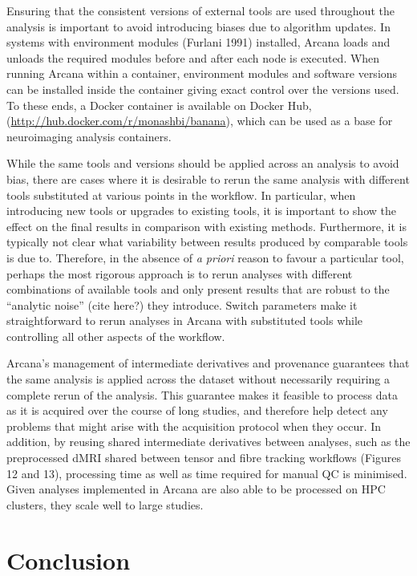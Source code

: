 Ensuring that the consistent versions of external tools are used
throughout the analysis is important to avoid introducing biases due to
algorithm updates. In systems with environment modules (Furlani 1991)
installed, Arcana loads and unloads the required modules before and
after each node is executed. When running Arcana within a container,
environment modules and software versions can be installed inside the
container giving exact control over the versions used. To these ends, a
Docker container is available on Docker Hub,
(\href{http://hub.docker.com/r/monashbi/banana}{{http://hub.docker.com/r/monashbi/banana}}),
which can be used as a base for neuroimaging analysis containers.

While the same tools and versions should be applied across an analysis
to avoid bias, there are cases where it is desirable to rerun the same
analysis with different tools substituted at various points in the
workflow. In particular, when introducing new tools or upgrades to
existing tools, it is important to show the effect on the final results
in comparison with existing methods. Furthermore, it is typically not
clear what variability between results produced by comparable tools is
due to. Therefore, in the absence of \emph{a priori} reason to favour a
particular tool, perhaps the most rigorous approach is to rerun analyses
with different combinations of available tools and only present results
that are robust to the ``analytic noise'' (cite here?) they introduce.
Switch parameters make it straightforward to rerun analyses in Arcana
with substituted tools while controlling all other aspects of the
workflow.

Arcana's management of intermediate derivatives and provenance
guarantees that the same analysis is applied across the dataset without
necessarily requiring a complete rerun of the analysis. This guarantee
makes it feasible to process data as it is acquired over the course of
long studies, and therefore help detect any problems that might arise
with the acquisition protocol when they occur. In addition, by reusing
shared intermediate derivatives between analyses, such as the
preprocessed dMRI shared between tensor and fibre tracking workflows
(Figures 12 and 13), processing time as well as time required for manual
QC is minimised. Given analyses implemented in Arcana are also able to
be processed on HPC clusters, they scale well to large studies.

\hypertarget{conclusion}{%
\section{Conclusion}\label{conclusion}}

